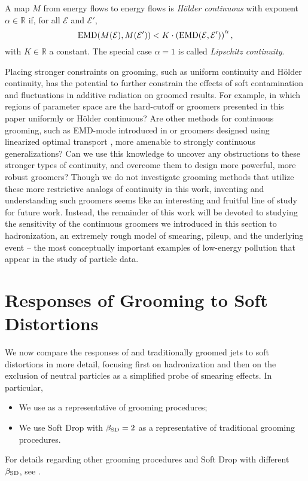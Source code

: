 \begin{definition}\label{def:eventholdercontinuity}
A map \(M\) from energy flows to energy flows is \textit{H\"older continuous} with exponent \(\alpha \in \mathbb R\) if, for all \(\mathcal{E}\) and \(\mathcal E'\),
%
\begin{equation*}\label{eqn:emdholdercontinuity}
    {\rm EMD}(M(\mathcal E), M(\mathcal E'))
    <
    K \cdot \left({\rm EMD}(\mathcal E, \mathcal E')\right)^\alpha,
\end{equation*}
with \(K\in \mathbb R\) a constant.
%
The special case \(\alpha = 1\) is called \textit{Lipschitz continuity}.
\end{definition}

Placing stronger constraints on grooming, such as uniform continuity and H\"older continuity, has the potential to further constrain the effects of soft contamination and fluctuations in additive radiation on groomed results.
%
For example, in which regions of parameter space are the hard-cutoff or \PIRANHA{} groomers presented in this paper uniformly or H\"older continuous?
%
Are other methods for continuous grooming, such as EMD-mode \PIRANHA{} introduced in  or \PIRANHA{} groomers designed using linearized optimal transport \cite{Cai:2020vzx,Cai:2021hnn,cai2022linearized,sarrazin2023linearized}, more amenable to strongly continuous generalizations?
%
Can we use this knowledge to uncover any obstructions to these stronger types of continuity, and overcome them to design more powerful, more robust groomers?
%
Though we do not investigate grooming methods that utilize these more restrictive analogs of continuity in this work, inventing and understanding such groomers seems like an interesting and fruitful line of study for future work.
%
Instead, the remainder of this work will be devoted to studying the sensitivity of the continuous groomers we introduced in this section to hadronization, an extremely rough model of smearing, pileup, and the underlying event -- the most conceptually important examples of low-energy pollution that appear in the study of particle data.


\section{Responses of Grooming to Soft Distortions}
\label{sec:soft_distortion}

We now compare the responses of \PIRANHA{} and traditionally groomed jets to soft distortions in more detail, focusing first on hadronization and then on the exclusion of neutral particles as a simplified probe of smearing effects.
%
In particular,
\begin{itemize}
    \item We use  as a representative of \PIRANHA{} grooming procedures;
    \item We use Soft Drop with \(\beta_{\rm SD} = 2\) as a representative of traditional grooming procedures.
\end{itemize}
%
For details regarding other \PIRANHA{} grooming procedures and Soft Drop with different \(\beta_{\rm SD}\), see .


